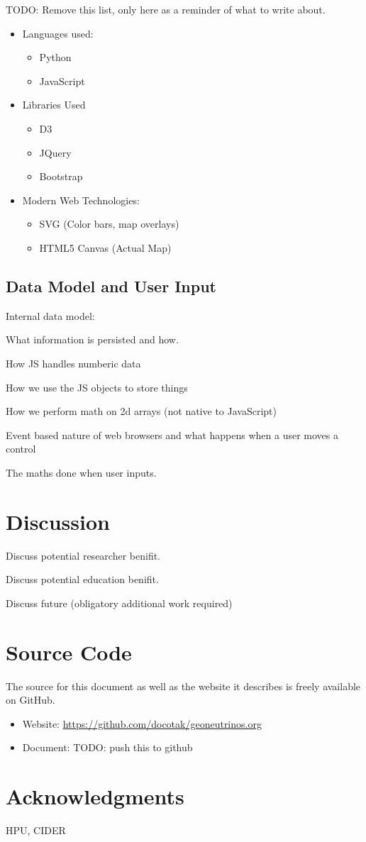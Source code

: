 \documentclass[12pt,a4paper]{article}
\begin{document}
TODO: Remove this list, only here as a reminder of what to write about.
\begin{itemize}
  \item Languages used:
  \begin{itemize}
    \item Python
    \item JavaScript
  \end{itemize}
  \item  Libraries Used
  \begin{itemize}
    \item D3
    \item JQuery
    \item Bootstrap
  \end{itemize}
  \item Modern Web Technologies:
  \begin{itemize}
    \item SVG (Color bars, map overlays)
    \item HTML5 Canvas (Actual Map)
  \end{itemize}
\end{itemize}

\subsection{Data Model and User Input}
Internal data model:

What information is persisted and how.

How JS handles numberic data

How we use the JS objects to store things

How we perform math on 2d arrays (not native to JavaScript)

Event based nature of web browsers and what happens when a user moves a control

The maths done when user inputs.

\section{Discussion}
Discuss potential researcher benifit.

Discuss potential education benifit.

Discuss future (obligatory additional work required)
\section{Source Code}
The source for this document as well as the website it describes is freely available on GitHub.
\begin{itemize}
 \item Website: \url{https://github.com/docotak/geoneutrinos.org}
 \item Document: TODO: push this to github
\end{itemize}
\section{Acknowledgments}
HPU, CIDER


\end{document}
